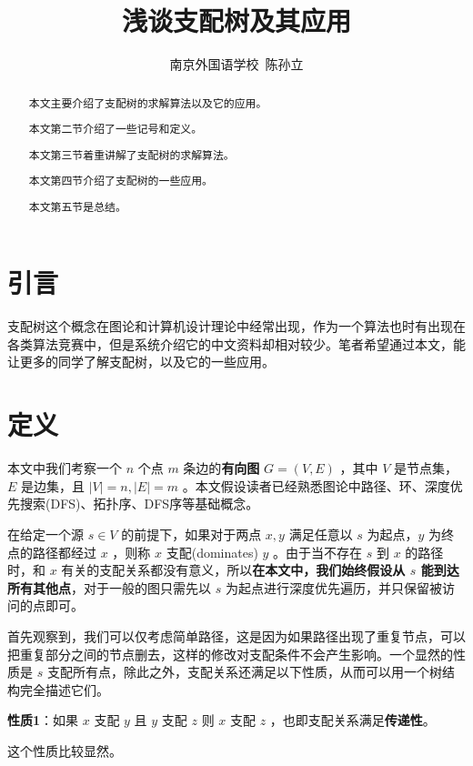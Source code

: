 \documentclass{noithesis}
\begin{document}
\title{浅谈支配树及其应用}
\author{南京外国语学校\ 陈孙立}

\maketitle

\begin{abstract}
	
	本文主要介绍了支配树的求解算法以及它的应用。
	
	本文第二节介绍了一些记号和定义。
	
	本文第三节着重讲解了支配树的求解算法。
	
	本文第四节介绍了支配树的一些应用。
	
	本文第五节是总结。
	
\end{abstract}

\section{引言}

支配树这个概念在图论和计算机设计理论中经常出现，作为一个算法也时有出现在各类算法竞赛中，但是系统介绍它的中文资料却相对较少。笔者希望通过本文，能让更多的同学了解支配树，以及它的一些应用。

\section{定义}

本文中我们考察一个 $n$ 个点 $m$ 条边的\textbf{有向图} $G = (V, E)$ ，其中 $V$ 是节点集，$E$ 是边集，且 $|V| = n, |E| = m$ 。本文假设读者已经熟悉图论中路径、环、深度优先搜索(DFS)、拓扑序、DFS序等基础概念。

在给定一个源 $s\in V$ 的前提下，如果对于两点 $x,y$ 满足任意以 $s$ 为起点，$y$ 为终点的路径都经过 $x$ ，则称 $x$ 支配(dominates) $y$ 。由于当不存在 $s$ 到 $x$ 的路径时，和 $x$ 有关的支配关系都没有意义，所以\textbf{在本文中，我们始终假设从 $s$ 能到达所有其他点}，对于一般的图只需先以 $s$ 为起点进行深度优先遍历，并只保留被访问的点即可。

首先观察到，我们可以仅考虑简单路径，这是因为如果路径出现了重复节点，可以把重复部分之间的节点删去，这样的修改对支配条件不会产生影响。一个显然的性质是 $s$ 支配所有点，除此之外，支配关系还满足以下性质，从而可以用一个树结构完全描述它们。

\textbf{性质1}：如果 $x$ 支配 $y$ 且 $y$ 支配 $z$ 则 $x$ 支配 $z$ ，也即支配关系满足\textbf{传递性}。

这个性质比较显然。
\end{document}
